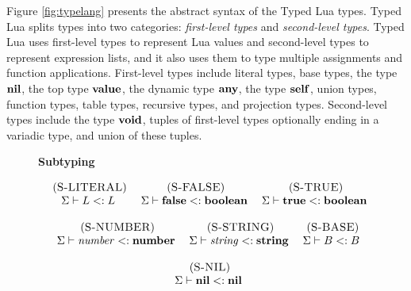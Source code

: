 Figure \ref{fig:typelang} presents the abstract syntax of the
Typed Lua types.
Typed Lua splits types into two categories:
\emph{first-level types} and \emph{second-level types}.
Typed Lua uses first-level types to represent Lua values and
second-level types to represent expression lists, and it also
uses them to type multiple assignments and function applications.
First-level types include literal types, base types, the type $\mathbf{nil}$,
the top type $\mathbf{value}$, the dynamic type $\mathbf{any}$, the type $\mathbf{self}$,
union types, function types, table types, recursive types, and
projection types.
Second-level types include the type $\mathbf{void}$, tuples of first-level
types optionally ending in a variadic type, and union of these tuples.

\begin{figure}[!ht]
\textbf{Subtyping}\\
\dstart
\begin{footnotesize}
$$
\begin{array}{c}
\begin{array}{c}
\mylabel{S-LITERAL}\\
\senv \vdash L \subtype L
\end{array}
\;
\begin{array}{c}
\mylabel{S-FALSE}\\
\senv \vdash \False \subtype \Boolean
\end{array}
\;
\begin{array}{c}
\mylabel{S-TRUE}\\
\senv \vdash \True \subtype \Boolean
\end{array}
\\ \\
\begin{array}{c}
\mylabel{S-NUMBER}\\
\senv \vdash {\it number} \subtype \Number
\end{array}
\;
\begin{array}{c}
\mylabel{S-STRING}\\
\senv \vdash {\it string} \subtype \String
\end{array}
\;
\begin{array}{c}
\mylabel{S-BASE}\\
\senv \vdash B \subtype B
\end{array}
\\ \\
\begin{array}{c}
\mylabel{S-NIL}\\
\senv \vdash \Nil \subtype \Nil
\end{array}

\end{array}$$
\end{footnotesize}
\end{figure}
